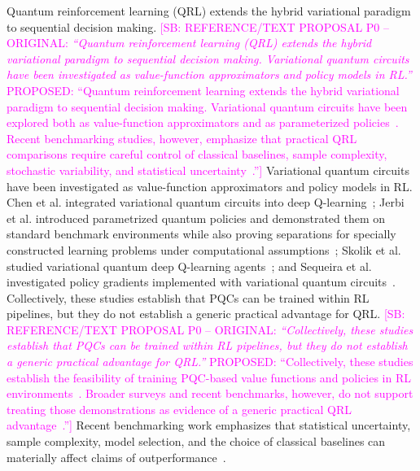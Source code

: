 \documentclass[aps,floatfix,superscriptaddress,twocolumn,tightenlines,amsmath,amssymb,nofootinbib,10pt,longbibliography,prl]{revtex4-2}
\newcommand{\sam}[1]{\textcolor{magenta}{[SB: {#1}]}}
\begin{document}
Quantum reinforcement learning (QRL) extends the hybrid variational paradigm to sequential decision making.
\sam{REFERENCE/TEXT PROPOSAL P0 -- ORIGINAL: \textit{``Quantum reinforcement learning (QRL) extends the hybrid variational paradigm to sequential decision making. Variational quantum circuits have been investigated as value-function approximators and policy models in RL.''} PROPOSED: ``Quantum reinforcement learning extends the hybrid variational paradigm to sequential decision making. Variational quantum circuits have been explored both as value-function approximators and as parameterized policies~\cite{Chen2020VariationalQuantumCi,Jerbi2021ParametrizedQuantumP,Skolik2022QuantumagentsintheGy,Sequeira2023Policygradientsusing}. Recent benchmarking studies, however, emphasize that practical QRL comparisons require careful control of classical baselines, sample complexity, stochastic variability, and statistical uncertainty~\cite{Meyer2025BenchmarkingQuantumR,Kruse2025BenchmarkingQuantumRL}.''} Variational quantum circuits have been investigated as value-function approximators and policy models in RL. Chen et al. integrated variational quantum circuits into deep Q-learning~\cite{Chen2020VariationalQuantumCi}; Jerbi et al. introduced parametrized quantum policies and demonstrated them on standard benchmark environments while also proving separations for specially constructed learning problems under computational assumptions~\cite{Jerbi2021ParametrizedQuantumP}; Skolik et al. studied variational quantum deep Q-learning agents~\cite{Skolik2022QuantumagentsintheGy}; and Sequeira et al. investigated policy gradients implemented with variational quantum circuits~\cite{Sequeira2023Policygradientsusing}. Collectively, these studies establish that PQCs can be trained within RL pipelines, but they do not establish a generic practical advantage for QRL.
\sam{REFERENCE/TEXT PROPOSAL P0 -- ORIGINAL: \textit{``Collectively, these studies establish that PQCs can be trained within RL pipelines, but they do not establish a generic practical advantage for QRL.''} PROPOSED: ``Collectively, these studies establish the feasibility of training PQC-based value functions and policies in RL environments~\cite{Chen2020VariationalQuantumCi,Jerbi2021ParametrizedQuantumP,Skolik2022QuantumagentsintheGy,Sequeira2023Policygradientsusing}. Broader surveys and recent benchmarks, however, do not support treating those demonstrations as evidence of a generic practical QRL advantage~\cite{Meyer2022SurveyQuantumRL,Kaldari2025QRLReview,Meyer2025BenchmarkingQuantumR,Kruse2025BenchmarkingQuantumRL}.''} Recent benchmarking work emphasizes that statistical uncertainty, sample complexity, model selection, and the choice of classical baselines can materially affect claims of outperformance~\cite{Meyer2025BenchmarkingQuantumR}.
\end{document}
